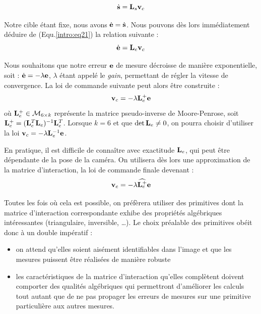 \begin{equation}
\dot {\bf s} = {\bf L}_s {\bf v}_c
\label{intro:eq21}
\end{equation}

Notre cible étant fixe, nous avons $\dot {\bf e} = \dot {\bf s}$. Nous pouvons 
dès lors immédiatement déduire de (Equ.\ref{intro:eq21}) la relation suivante :
\begin{equation}
\dot {\bf e} = {\bf L}_e {\bf v}_c
\label{intro:eq22}
\end{equation}

Nous souhaitons que notre erreur ${\bf e}$ de mesure décroisse de manière 
exponentielle, soit : $\dot {\bf e} = - \lambda {\bf e}$, $\lambda$ étant 
appelé 
le {\it gain}, permettant de régler la vitesse de convergence. La loi de 
commande suivante peut alors être construite :
\begin{equation}
{\bf v}_c = - \lambda {\bf L}_e^+ {\bf e} 
\label{intro:eq23}
\end{equation}
où ${\bf L}_e^+ \in \mathcal M_{6 \times k}$ représente la matrice 
pseudo-inverse de Moore-Penrose, soit ${\bf L}_e^+ = ({\bf L}_e^T {\bf 
L}_e)^{-1} {\bf L}_e^T$. Lorsque $k = 6$ et que $\det {\bf L}_e \neq 0$, on 
pourra choisir d'utiliser la loi ${\bf v}_c = - \lambda {\bf L}_e^{-1} {\bf e} 
$.

En pratique, il est difficile de connaître avec exactitude ${\bf L}_e$, qui 
peut 
être dépendante de la pose de la caméra. On utilisera dès lors une 
approximation 
de la matrice d'interaction, la loi de commande finale devenant :
\begin{equation}
{\bf v}_c = - \lambda \widehat {{\bf L}_e^+} {\bf e} 
\label{intro:eq24}
\end{equation}

Toutes les fois où cela est possible, on préfèrera utiliser des primitives dont 
la matrice d'interaction correspondante exhibe des propriétés algébriques 
inté\-ressantes (triangulaire, inversible, \dots). Le choix préalable des 
primitives obéit donc à un double impératif :
\begin{itemize}
 \item on attend qu'elles soient aisément identifiables dans l'image et que les 
mesures puissent être réalisées de manière robuste
 \item les caractéristiques de la matrice d'interaction qu'elles complètent 
doivent comporter des qualités algébriques qui permettront d'améliorer les 
calculs tout autant que de ne pas propager les erreurs de mesures sur une 
primitive particulière aux autres mesures.
\end{itemize}



